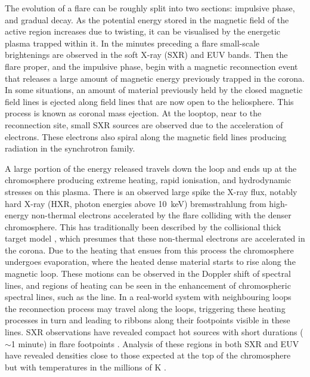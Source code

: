 The evolution of a flare can be roughly split into two sections: impulsive phase, and gradual decay.
As the potential energy stored in the magnetic field of the active region increases due to twisting, it can be visualised by the energetic plasma trapped within it.
In the minutes preceding a flare small-scale brightenings are observed in the soft X-ray (SXR) and EUV bands.
Then the flare proper, and the impulsive phase, begin with a magnetic reconnection event that releases a large amount of magnetic energy previously trapped in the corona.
In some situations, an amount of material previously held by the closed magnetic field lines is ejected along field lines that are now open to the heliosphere.
This process is known as coronal mass ejection.
At the looptop, near to the reconnection site, small SXR sources are observed due to the acceleration of electrons.
These electrons also spiral along the magnetic field lines producing radiation in the synchrotron family.

A large portion of the energy released travels down the loop and ends up at the chromosphere producing extreme heating, rapid ionisation, and hydrodynamic stresses on this plasma.
There is an observed large spike the X-ray flux, notably hard X-ray (HXR, photon energies above \SI{10}{\kilo\electronvolt}) bremsstrahlung from high-energy non-thermal electrons accelerated by the flare colliding with the denser chromosphere.
This has traditionally been described by the collisional thick target model \citep{Brown1971,Hudson1972}, which presumes that these non-thermal electrons are accelerated in the corona.
Due to the heating that ensues from this process the chromosphere undergoes evaporation, where the heated dense material starts to rise along the magnetic loop.
These motions can be observed in the Doppler shift of spectral lines, and regions of heating can be seen in the enhancement of chromospheric spectral lines, such as the \Ha{} line.
In a real-world system with neighbouring loops the reconnection process may travel along the loops, triggering these heating processes in turn and leading to ribbons along their footpoints visible in these lines.
SXR observations have revealed compact hot sources with short durations ($\sim$1 minute) in flare footpoints \citep{Hudson1994}.
Analysis of these regions in both SXR and EUV have revealed densities close to those expected at the top of the chromosphere but with temperatures in the millions of \si{\kelvin} \citep{Mrozek2004,Graham2013,Simoes2015}.

